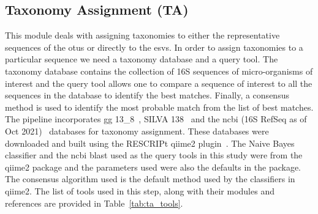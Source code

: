  \subsection*{Taxonomy Assignment (TA)}
  \vspace{-5mm}
  This module deals with assigning taxonomies to either the representative sequences of the \ac{otu}s or directly to the \ac{esv}s.
  In order to assign taxonomies to a particular sequence we need a taxonomy database and a query tool.
  The taxonomy database contains the collection of 16S sequences of micro-organisms of interest and the query tool allows one to compare a sequence of interest to all the sequences in the database to identify the best matches.
  Finally, a consensus method is used to identify the most probable match from the list of best matches.
  The pipeline incorporates \ac{gg} 13\_8~\cite{DeSantis2006}, SILVA 138~\cite{Quast2012} and the \ac{ncbi} (16S RefSeq as of Oct 2021)~\cite{Sayers2009} databases for taxonomy assignment.
  These databases were downloaded and built using the RESCRIPt qiime2 plugin~\cite{iiRESCRIPtReproducibleSequence2021}.
  The Naive Bayes classifier and the \ac{ncbi} blast used as the query tools in this study were from the \ac{qiime2} package and the parameters used were also the defaults in the package.
  The consensus algorithm used is the default method used by the classifiers in \ac{qiime2}.
  The list of tools used in this step, along with their modules and references are provided in Table~\ref{tab:ta_tools}.

